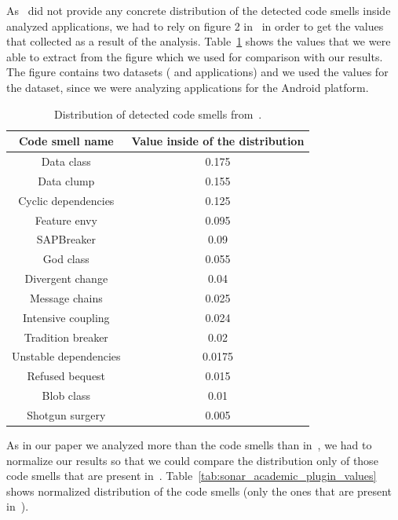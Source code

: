 As~\citeauthor{mannan2016understanding} did not provide any concrete distribution of the detected
code smells inside analyzed applications, we had to rely on figure 2 in~\cite{mannan2016understanding} in order
to get the values that collected as a result of the analysis.
Table~\ref{tab:understading_andoid_smells_values} shows the values that we were able to extract from the figure which we used for comparison
with our results.
The figure contains two datasets ( and  applications) and we used the values for the 
dataset, since we were analyzing applications for the Android platform.

\begin{table}
    \begin{center}
        \begin{tabular} {| c | c |}
            \hline
            \textbf{Code smell name} & \textbf{Value inside of the distribution} \\ \hline
            Data class & 0.175 \\ \hline
            Data clump & 0.155 \\ \hline
            Cyclic dependencies & 0.125 \\ \hline
            Feature envy & 0.095 \\ \hline
            SAPBreaker & 0.09 \\ \hline
            God class & 0.055 \\ \hline
            Divergent change & 0.04 \\ \hline
            Message chains & 0.025 \\ \hline
            Intensive coupling & 0.024 \\ \hline
            Tradition breaker & 0.02 \\ \hline
            Unstable dependencies & 0.0175 \\ \hline
            Refused bequest & 0.015 \\ \hline
            Blob class & 0.01 \\ \hline
            Shotgun surgery & 0.005 \\ \hline
        \end{tabular}
        \caption{Distribution of detected code smells from~\cite{mannan2016understanding}.}
        \label{tab:understading_andoid_smells_values}
    \end{center}
\end{table}

As in our paper we analyzed more than the code smells than in~\cite{mannan2016understanding}, we had to normalize
our results so that we could compare the distribution only of those code smells that are present in~\cite{mannan2016understanding}.
Table~\ref{tab:sonar_academic_plugin_values} shows normalized distribution of the code smells (only the ones that
are present in~\cite{mannan2016understanding}).

